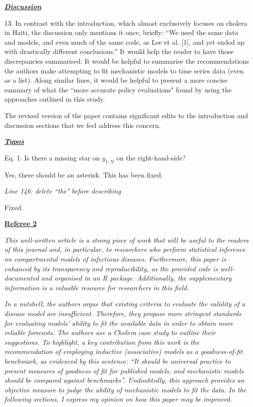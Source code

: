 \documentclass[11pt]{article}
\newcommand\report[1]{{\color{mygreen} \vspace{1mm}\hspace{0.25in}\parbox{6in}{\em #1}}}
\begin{document}
\report{
  \textbf{\underline{Discussion}}

13. In contrast with the introduction, which almost exclusively focuses on cholera in Haiti, the discussion only mentions it once, briefly: ``We used the same data and models, and even much of the same code, as Lee et al. [1], and yet ended up with drastically different conclusions." It would help the reader to have those discrepancies summarised. It would be helpful to summarise the recommendations the authors make attempting to fit mechanistic models to time series data (even as a list). Along similar lines, it would be helpful to present a more concise summary of what the ``more accurate policy evaluations" found by using the approaches outlined in this study.
}

The revised version of the paper contains significant edits to the introduction and discussion sections that we feel address this concern.

\report{
  \textbf{\underline{Typos}}

  Eq. 1: Is there a missing star on $y_{1:N}$ on the right-hand-side?
}

Yes, there should be an asterisk. This has been fixed.

\report{
  Line 146: delete ``the" before describing
}

Fixed.

\newpage


\begin{center}
{\large{\textbf{\underline{Referee 2}}}} %
\end{center}


\report{
  This well-written article is a strong piece of work that will be useful to the readers of this journal and, in particular, to researchers who perform statistical inference on compartmental models of infectious diseases. Furthermore, this paper is enhanced by its transparency and reproducibility, as the provided code is well-documented and organised in an R package. Additionally, the supplementary information is a valuable resource for researchers in this field.
}

\report{
  In a nutshell, the authors argue that existing criteria to evaluate the validity of a disease model are insufficient. Therefore, they propose more stringent standards for evaluating models’ ability to fit the available data in order to obtain more reliable forecasts. The authors use a Cholera case study to outline their suggestions. To highlight, a key contribution from this work is the recommendation of employing inductive (associative) models as a goodness-of-fit benchmark, as evidenced by this sentence: “It should be universal practice to present measures of goodness of fit for published models, and mechanistic models should be compared against benchmarks”. Undoubtedly, this approach provides an objective measure to judge the ability of mechanistic models to fit the data. In the following sections, I express my opinion on how this paper may be improved.
}
\end{document}
